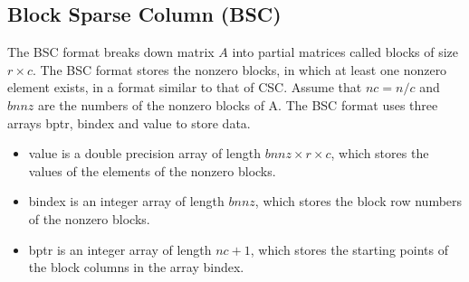 \documentclass[a4paper]{article}
\begin{document}
\newpage
\subsection{Block Sparse Column (BSC)}
The BSC format breaks down matrix $A$ into partial matrices called
blocks of size $r \times c$. The BSC format stores the nonzero blocks, in which at
least one nonzero element exists, in a format similar to that of CSC. Assume
that $nc=n/c$ and $bnnz$ are the numbers of the nonzero
blocks of A. The BSC format uses three arrays {\ttfamily bptr}, {\ttfamily bindex}
and {\ttfamily value} to store data. 
\begin{itemize}
\item {\ttfamily value} is a double precision array of length
      $bnnz \times r \times c$, which stores the values of the elements of the nonzero blocks.
\item {\ttfamily bindex} is an integer array of length $bnnz$,
      which stores the block row numbers of the nonzero blocks.
\item {\ttfamily bptr} is an integer array of length $nc+1$,
      which stores the starting points of the block columns in the array
      {\ttfamily bindex}.
\end{itemize}
\end{document}
